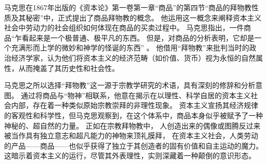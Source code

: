 马克思在1867年出版的《资本论》第一卷第一章“商品”的第四节“商品的拜物教性质及其秘密”中，正式提出了商品拜物教的概念。
他运用这一概念来阐释资本主义社会中劳动力的社会组织如何体现在商品的买卖过程中。
马克思指出，一件商品“乍看起来是一个极普通、极平凡的东西。
但是，对商品的分析表明，它却是一个充满形而上学的微妙和神学的怪诞的东西” \autocite{marx}。
他借用“拜物教”来批判当时的政治经济学家，认为他们将资本主义的经济范畴（如价值、货币）视为永恒的自然属性，从而掩盖了其历史性和社会性。

马克思之所以选择“拜物教”这一源于宗教学研究的术语，具有深刻的修辞和分析意图。
通过将商品与“物神”相联系，他意在揭示在以理性、科学自居的资本主义社会内部，存在着一种类似原始宗教崇拜的非理性现象。
资本主义宣扬其经济规律的客观性和科学性，但马克思观察到，在这个体系中，商品本身似乎被赋予了一种神秘的、超自然的力量。
正如在宗教拜物教中，
人创造出来的偶像或图腾反过来被当作具有独立意志和超凡能力的神物来顶礼膜拜，
在资本主义社会，人类劳动的产品——商品——也似乎获得了独立于其创造者的固有价值和自主运动的魔力。
这暗示着资本主义的运行，尽管其外表理性，实则深藏着一种颠倒的意识形态。